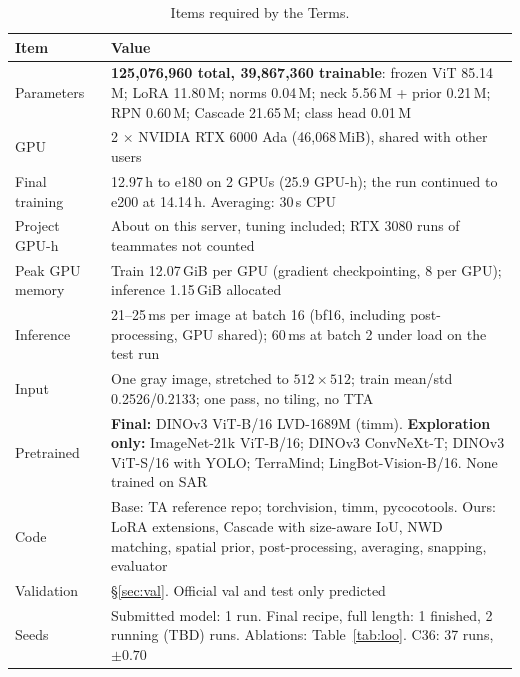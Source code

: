 \begin{table}[t]
\centering\footnotesize\setlength{\tabcolsep}{3.5pt}
\begin{tabular}{@{}p{1.65cm}p{6.1cm}@{}}
\toprule
Item & Value\\
\midrule
Parameters & \textbf{125,076,960 total, 39,867,360 trainable}: frozen ViT 85.14\,M; LoRA 11.80\,M; norms 0.04\,M; neck 5.56\,M + prior 0.21\,M; RPN 0.60\,M; Cascade 21.65\,M; class head 0.01\,M\\
GPU & 2 $\times$ NVIDIA RTX 6000 Ada (46,068\,MiB), shared with other users\\
Final training & 12.97\,h to e180 on 2 GPUs (25.9 GPU-h); the run continued to e200 at 14.14\,h. Averaging: 30\,s CPU\\
Project GPU-h & About \GPUH{} on this server, tuning included; RTX 3080 runs of teammates not counted\\
Peak GPU memory & Train 12.07\,GiB per GPU (gradient checkpointing, 8 per GPU); inference 1.15\,GiB allocated\\
Inference & 21--25\,ms per image at batch 16 (bf16, including post-processing, GPU shared); 60\,ms at batch 2 under load on the test run\\
Input & One gray image, stretched to $512{\times}512$; train mean/std 0.2526/0.2133; one pass, no tiling, no TTA\\
Pretrained & \textbf{Final:} DINOv3 ViT-B/16 LVD-1689M (timm). \textbf{Exploration only:} ImageNet-21k ViT-B/16; DINOv3 ConvNeXt-T; DINOv3 ViT-S/16 with YOLO; TerraMind; LingBot-Vision-B/16. None trained on SAR\\
Code & Base: TA reference repo; torchvision, timm, pycocotools. Ours: LoRA extensions, Cascade with size-aware IoU, NWD matching, spatial prior, post-processing, averaging, snapping, evaluator\\
Validation & \S\ref{sec:val}. Official val and test only predicted\\
Seeds & Submitted model: 1 run. Final recipe, full length: 1 finished, 2 running (TBD) runs. Ablations: Table~\ref{tab:loo}. C36: 37 runs, $\pm0.70$\\
\bottomrule
\end{tabular}
\caption{Items required by the Terms.}
\label{tab:terms}
\end{table}
